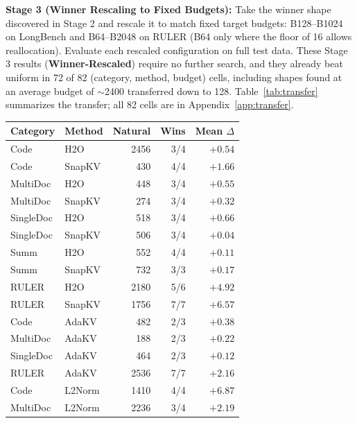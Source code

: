 \documentclass[11pt]{article}
\begin{document}
\textbf{Stage 3 (Winner Rescaling to Fixed Budgets):} Take the winner shape discovered in Stage 2 and rescale it to match fixed target budgets: B128--B1024 on LongBench and B64--B2048 on RULER (B64 only where the floor of 16 allows reallocation). Evaluate each rescaled configuration on full test data. These Stage 3 results (\textbf{Winner-Rescaled}) require no further search, and they already beat uniform in 72 of 82 (category, method, budget) cells, including shapes found at an average budget of $\sim$2400 transferred down to 128. Table~\ref{tab:transfer} summarizes the transfer; all 82 cells are in Appendix~\ref{app:transfer}.

\begin{table}[htbp]
  \centering
  \footnotesize
  \setlength{\tabcolsep}{2.5pt}
  \begin{tabular}{@{} l l r r r @{}}
    \toprule
    \textbf{Category} & \textbf{Method} & \textbf{Natural} & \textbf{Wins} & \textbf{Mean $\Delta$} \\
    \midrule
    \rowcolor{gray!10}
    Code      & H2O    & 2456 & 3/4 & $+0.54$ \\
    Code      & SnapKV & 430  & 4/4 & $+1.66$ \\
    \rowcolor{gray!10}
    MultiDoc  & H2O    & 448  & 3/4 & $+0.55$ \\
    MultiDoc  & SnapKV & 274  & 3/4 & $+0.32$ \\
    \rowcolor{gray!10}
    SingleDoc & H2O    & 518  & 3/4 & $+0.66$ \\
    SingleDoc & SnapKV & 506  & 3/4 & $+0.04$ \\
    \rowcolor{gray!10}
    Summ      & H2O    & 552  & 4/4 & $+0.11$ \\
    Summ      & SnapKV & 732  & 3/3 & $+0.17$ \\
    \rowcolor{gray!10}
    RULER     & H2O    & 2180 & 5/6 & $+4.92$ \\
    RULER     & SnapKV & 1756 & 7/7 & $+6.57$ \\
    \midrule
    \rowcolor{gray!10}
    Code      & AdaKV  & 482  & 2/3 & $+0.38$ \\
    MultiDoc  & AdaKV  & 188  & 2/3 & $+0.22$ \\
    \rowcolor{gray!10}
    SingleDoc & AdaKV  & 464  & 2/3 & $+0.12$ \\
    RULER     & AdaKV  & 2536 & 7/7 & $+2.16$ \\
    \midrule
    \rowcolor{gray!10}
    Code      & L2Norm & 1410 & 4/4 & $+6.87$ \\
    MultiDoc  & L2Norm & 2236 & 3/4 & $+2.19$ \\

\end{tabular}
\end{table}
\end{document}
